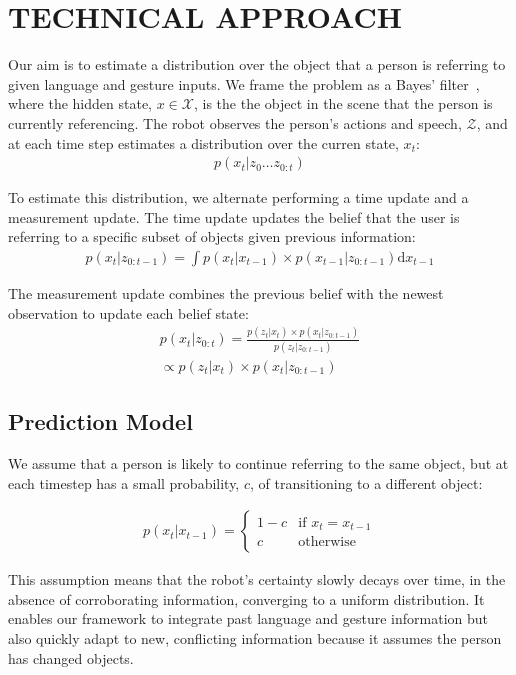 \documentclass[letterpaper, 10 pt, conference]{ieeeconf}
\begin{document}
\section{TECHNICAL APPROACH}



Our aim is to estimate a distribution over the object that a person is
referring to given language and gesture inputs.  We frame the problem
as a Bayes' filter~\citep{thrun08}, where the hidden state,
$x \in \mathcal{X}$, is the the object in the scene that the person is
currently referencing. The robot observes the person's actions and
speech, $\mathcal{Z}$, and at each time step estimates a distribution
over the curren state, $x_t$:
\begin{align}
  p(x_t | z_0 \dots z_{0:t})
\end{align}


To estimate this distribution, we alternate performing a time update
and a measurement update.  The time update updates the belief that the
user is referring to a specific subset of objects given previous
information:
\begin{align}
p(x_t | z_{0:t-1}) = \int p(x_t|x_{t-1})\times p(x_{t-1} | z_{0:t-1}) \text{d}x_{t-1}
\end{align}

The measurement update combines the previous belief with the newest observation to update each belief state: 
\begin{align}
p(x_t |z_{0:t}) = \frac{p(z_t | x_t) \times p(x_t | z_{0:t-1})}{p(z_t | z_{0:t-1})} \\\propto p(z_t | x_t) \times p(x_t | z_{0:t-1})
\end{align}



\subsection{Prediction Model}
We assume that a person is likely to continue referring to the same
object, but at each timestep has a small probability, $c$, of
transitioning to a different object: 

\begin{align}
p(x_t | x_{t-1}) = \left\{  \begin{array}{ll}
1-c &\mbox{if } x_t = x_{t-1}\\
c &\mbox{otherwise}
\end{array}\right.
\end{align}

This assumption means that the robot's certainty slowly decays over
time, in the absence of corroborating information, converging to a
uniform distribution.  It enables our framework to integrate past
language and gesture information but also quickly adapt to new,
conflicting information because it assumes the person has changed
objects.
\end{document}
